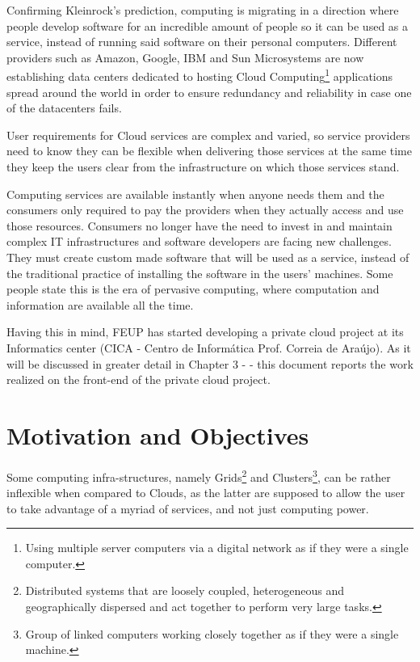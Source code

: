 Confirming Kleinrock's prediction, computing is migrating in a direction where people develop software for an incredible amount of people so it can be used as a service, instead of running said software on their personal computers. Different providers such as Amazon, Google, IBM and Sun Microsystems are now establishing data centers dedicated to hosting Cloud Computing\footnote{Using multiple server computers via a digital network as if they were a single computer.} applications spread around the world in order to ensure redundancy and reliability in case one of the datacenters fails. 

User requirements for Cloud services are complex and varied, so service providers need to know they can be flexible when delivering those services at the same time they keep the users clear from the infrastructure on which those services stand.

Computing services are available instantly when anyone needs them and the consumers only required to pay the providers when they actually access and use those resources. Consumers no longer have the need to invest in and maintain complex IT infrastructures and software developers are facing new challenges. They must create custom made software that will be used as a service, instead of the traditional practice of installing the software in the users' machines. Some people state this is the era of pervasive computing, where computation and information are available all the time.~\citet{ieees}

Having this in mind, FEUP has started developing a private cloud project at its Informatics center (CICA - Centro de Informática Prof. Correia de Araújo). As it will be discussed in greater detail in Chapter 3 -  - this document reports the work realized on the front-end of the private cloud project.

\section{Motivation and Objectives} \label{sec:motivation}

Some computing infra-structures, namely Grids\footnote{Distributed systems that are loosely coupled, heterogeneous and geographically dispersed and act together to perform very large tasks.} and Clusters\footnote{Group of linked computers working closely together as if they were a single machine.}, can be rather inflexible when compared to Clouds, as the latter are supposed to allow the user to take advantage of a myriad of services, and not just computing power.~\cite{brighthub}
	
